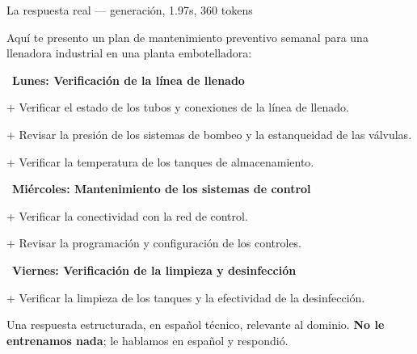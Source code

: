 \documentclass[aspectratio=169, 11pt]{beamer}
\begin{document}
\begin{frame}[shrink]{La respuesta real --- generación, 1.97s, 360 tokens}
  \vspace{2pt}
  \begin{tcolorbox}[colback=arcaGray, colframe=codeGreen, leftrule=3pt,
    boxrule=0pt, sharp corners, left=8pt, right=8pt, top=4pt, bottom=4pt,
    title={\scriptsize\color{white}\bfseries Llama 3.1-8B en Groq},
    coltitle=white, colbacktitle=codeGreen, fonttitle=\scriptsize]
    {\scriptsize\color{textDark}
    Aquí te presento un plan de mantenimiento preventivo semanal para una llenadora
    industrial en una planta embotelladora:\par
    \vspace{2pt}
    \textbullet\ \textbf{Lunes: Verificación de la línea de llenado}\par
    \quad+ Verificar el estado de los tubos y conexiones de la línea de llenado.\par
    \quad+ Revisar la presión de los sistemas de bombeo y la estanqueidad de las válvulas.\par
    \quad+ Verificar la temperatura de los tanques de almacenamiento.\par
    \vspace{2pt}
    \textbullet\ \textbf{Miércoles: Mantenimiento de los sistemas de control}\par
    \quad+ Verificar la conectividad con la red de control.\par
    \quad+ Revisar la programación y configuración de los controles.\par
    \vspace{2pt}
    \textbullet\ \textbf{Viernes: Verificación de la limpieza y desinfección}\par
    \quad+ Verificar la limpieza de los tanques y la efectividad de la desinfección.}
  \end{tcolorbox}
  \vspace{4pt}
  {\footnotesize\color{arcaDark}
  Una respuesta estructurada, en español técnico, relevante al dominio.
  \textbf{No le entrenamos nada}; le hablamos en español y respondió.}
\end{frame}
\end{document}
